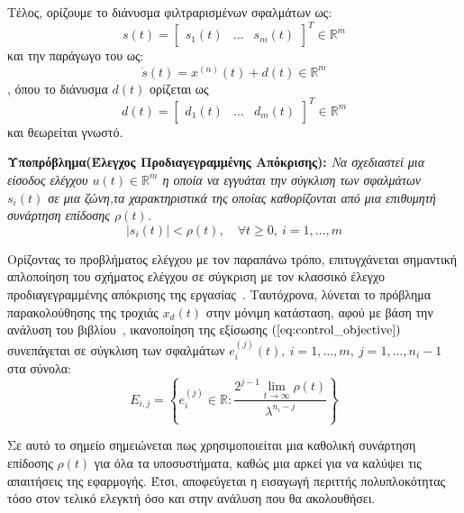 Τέλος, ορίζουμε το διάνυσμα φιλτραρισμένων σφαλμάτων ως:
\begin{equation*}
	s(t) = \begin{bmatrix}s_1(t) & \dots & s_m(t)\end{bmatrix}^T 
	\in \mathbb{R}^m
\end{equation*}
και την παράγωγο του ως:
\begin{equation}
	\dot{s}(t) = x^{(n)}(t) + d(t) \in \mathbb{R}^m
	\label{eq:filter_ders_vec}
\end{equation}
, όπου το διάνυσμα $d(t)$ ορίζεται ως
\begin{equation*}
d(t) = \begin{bmatrix}d_1(t) & \dots & d_m(t)\end{bmatrix}^T 
\in \mathbb{R}^m
\end{equation*}
και θεωρείται γνωστό.


\textbf{Υποπρόβλημα(Έλεγχος Προδιαγεγραμμένης Απόκρισης):} 
\emph{Να σχεδιαστεί μια είσοδος ελέγχου $u(t) \in \mathbb{R}^m$ η οποία να εγγυάται την σύγκλιση των σφαλμάτων $s_i(t)$ σε μια ζώνη,τα χαρακτηριστικά της οποίας καθορίζονται από μια επιθυμητή συνάρτηση επίδοσης $\rho(t)$.
\begin{equation}
	|s_i(t)| < \rho(t), \quad \forall t \geq 0, \: i=1,\dots,m
	\label{eq:control_objective}
\end{equation}
}

Ορίζοντας το προβλήματος ελέγχου με τον παραπάνω τρόπο, επιτυγχάνεται σημαντική απλοποίηση του σχήματος ελέγχου σε σύγκριση με τον κλασσικό έλεγχο προδιαγεγραμμένης απόκρισης της εργασίας~\cite{bechlioulis2008robust}. Ταυτόχρονα, λύνεται το πρόβλημα παρακολούθησης της τροχιάς $x_d(t)$ στην μόνιμη κατάσταση, αφού με βάση την ανάλυση του βιβλίου~\cite[p.276-280]{slotine1991applied}, ικανοποίηση της εξίσωσης $(\ref{eq:control_objective})$ συνεπάγεται σε σύγκλιση των σφαλμάτων $e_i^{(j)}(t),\: i = 1,\dots,m, \: j = 1,\dots,n_i-1$ στα σύνολα:
\begin{equation}
	E_{i,j} = \left\{ e_i^{(j)} \in \mathbb{R} :
			\frac{ 2^{j-1} \lim\limits_{t \rightarrow \infty}\rho(t)}{\lambda^{n_i - j}} \right\}
\end{equation}

Σε αυτό το σημείο σημειώνεται πως χρησιμοποιείται μια καθολική συνάρτηση επίδοσης $\rho(t)$ για όλα τα υποσυστήματα, καθώς μια αρκεί για να καλύψει τις απαιτήσεις της εφαρμογής. Έτσι, αποφεύγεται η εισαγωγή περιττής πολυπλοκότητας τόσο στον τελικό ελεγκτή όσο και στην ανάλυση που θα ακολουθήσει.


